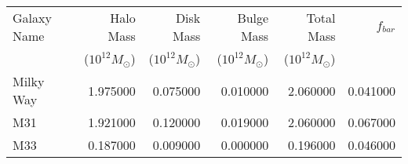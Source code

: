 \documentclass{article}
\begin{document}
\begin{tabular}{lrrrrr}
\toprule
Galaxy Name & Halo Mass & Disk Mass & Bulge Mass & Total Mass & $f_{bar}$ \\
& ($10^{12}M_{\odot}$) & ($10^{12}M_{\odot}$) & ($10^{12}M_{\odot}$) & ($10^{12}M_{\odot}$) & \\
\midrule
Milky Way & 1.975000 & 0.075000 & 0.010000 & 2.060000 & 0.041000 \\
M31 & 1.921000 & 0.120000 & 0.019000 & 2.060000 & 0.067000 \\
M33 & 0.187000 & 0.009000 & 0.000000 & 0.196000 & 0.046000 \\
\bottomrule
\end{tabular}
\end{document}
